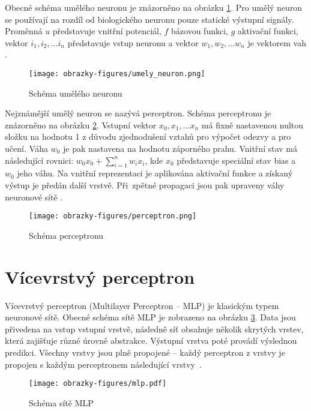 Obecné schéma umělého neuronu je znázorněno na obrázku \ref{fig:umelyneuron}. Pro umělý neuron se používají na rozdíl od biologického neuronu pouze statické výstupní signály. Proměnná $u$ představuje vnitřní potenciál, $f$ bázovou funkci, $g$ aktivační funkci, vektor $i_1, i_2,\ldots i_n$ představuje vstup neuronu a vektor $w_1, w_2,\ldots w_n$ je vektorem vah \cite{IZULecture}. 

\begin{figure}[!htbp]
    \centering
    \texttt{[image: obrazky-figures/umely\_neuron.png]}
    \caption{Schéma umělého neuronu \cite{IZULecture}}
    \label{fig:umelyneuron}
\end{figure}


Nejznámější umělý neuron se nazývá perceptron. Schéma perceptronu je znázorněno na obrázku \ref{fig:perceptron}. Vstupní vektor $x_0, x_1,\ldots x_n$ má fixně nastavenou nultou složku na hodnotu 1 z důvodu zjednodušení vztahů pro výpočet odezvy a pro učení. Váha $w_0$ je pak nastavena na hodnotu záporného prahu. Vnitřní stav má následující rovnici: $w_0x_0 + \sum_{i=1}^{n}w_ix_i$, kde $x_0$ představuje speciální stav bias a $w_0$ jeho váhu. Na vnitřní reprezentaci je aplikována aktivační funkce a získaný výstup je předán další vrstvě. Při~zpětné propagaci jsou pak upraveny váhy neuronové sítě \cite{IZULecture}.

\begin{figure}[!htbp]
    \centering
    \texttt{[image: obrazky-figures/perceptron.png]}
    \caption{Schéma perceptronu \cite{IZULecture}}
    \label{fig:perceptron}
\end{figure}

\section{Vícevrstvý perceptron}
\label{section:MLP}
Vícevrstvý perceptron (Multilayer Perceptron -- MLP) je klasickým typem neuronové sítě. Obecné schéma sítě MLP je zobrazeno na obrázku \ref{fig:mlp}. Data jsou přivedena na vstup vstupní vrstvě, následně síť obsahuje několik skrytých vrstev, která zajišťuje různé úrovně abstrakce. Výstupní vrstva poté provádí výslednou predikci. Všechny vrstvy jsou plně propojené -- každý perceptron z vrstvy je propojen s každým perceptronem následující vrstvy~\cite{WhenToUseMLPCNN}.

\begin{figure}[!htbp]
    \centering
    \texttt{[image: obrazky-figures/mlp.pdf]}
    \caption{Schéma sítě MLP}
    \label{fig:mlp}
\end{figure}

